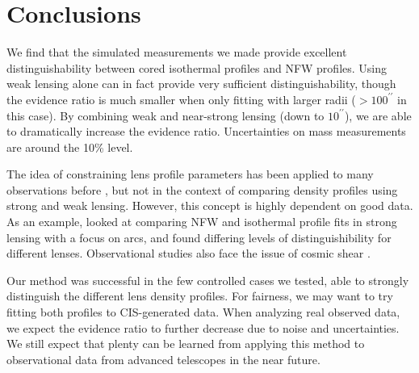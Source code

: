 \documentclass[10pt]{article}
\begin{document}
\newpage

\section{Conclusions}
We find that the simulated measurements we made provide excellent distinguishability between cored isothermal profiles and NFW profiles. Using weak lensing alone can in fact provide very sufficient distinguishability, though the evidence ratio is much smaller when only fitting with larger radii ($> 100^{\prime \prime}$ in this case). By combining weak and near-strong lensing (down to $10^{\prime \prime}$), we are able to dramatically increase the evidence ratio. Uncertainties on mass measurements are around the 10\% level.

The idea of constraining lens profile parameters has been applied to many observations before \citep{Bartelmann1996}, but not in the context of comparing density profiles using strong and weak lensing. However, this concept is highly dependent on good data. As an example, \citet{Shu2008} looked at comparing NFW and isothermal profile fits in strong lensing with a focus on arcs, and found differing levels of distinguishibility for different lenses. Observational studies also face the issue of cosmic shear \citep{Dodelson2004}.

Our method was successful in the few controlled cases we tested, able to strongly distinguish the different lens density profiles. For fairness, we may want to try fitting both profiles to CIS-generated data. When analyzing real observed data, we expect the evidence ratio to further decrease due to noise and uncertainties. We still expect that plenty can be learned from applying this method to observational data from advanced telescopes in the near future.

{
\linespread{1.0}
\selectfont


}
\end{document}
